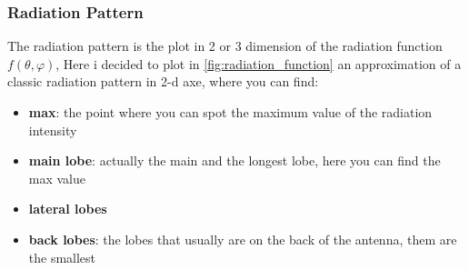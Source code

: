 \subsubsection*{Radiation Pattern}
The radiation pattern is the plot in 2 or 3 dimension of the radiation function $f(\theta,\varphi)$, Here i decided to plot in \cref{fig:radiation_function} an approximation of a classic radiation pattern in 2-d axe, where you can find:
\begin{itemize}
    \item \textbf{max}: the point where you can spot the maximum value of the radiation intensity
    \item \textbf{main lobe}: actually the main and the longest lobe, here you can find the max value
    \item \textbf{lateral lobes}
    \item \textbf{back lobes}: the lobes that usually are on the back of the antenna, them are the smallest
\end{itemize}
